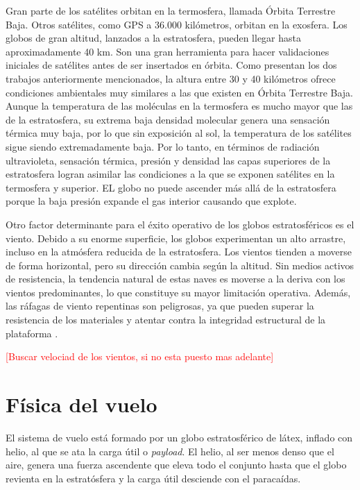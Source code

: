 \documentclass[12pt,a4paper]{article}
\newcommand{\pendiente}[1]{\textcolor{red}{[#1]}}
\begin{document}
Gran parte de los satélites orbitan en la termosfera, llamada Órbita Terrestre Baja. Otros satélites, como GPS a 36.000 kilómetros, orbitan en la exosfera. Los globos de gran altitud, lanzados a la estratosfera, pueden llegar hasta aproximadamente 40 km. Son una gran herramienta para hacer validaciones iniciales de satélites antes de ser insertados en órbita. Como presentan los dos trabajos anteriormente mencionados, la altura entre 30 y 40 kilómetros ofrece condiciones ambientales muy similares a las que existen en Órbita Terrestre Baja. Aunque la temperatura de las moléculas en la termosfera es mucho mayor que las de la estratosfera, su extrema baja densidad molecular genera una sensación térmica muy baja, por lo que sin exposición al sol, la temperatura de los satélites sigue siendo extremadamente baja. Por lo tanto, en términos de radiación ultravioleta, sensación térmica, presión y densidad las capas superiores de la estratosfera logran asimilar las condiciones a la que se exponen satélites en la termosfera y superior. EL globo no puede ascender más allá de la estratosfera porque la baja presión expande el gas interior causando que explote.

Otro factor determinante para el éxito operativo de los globos estratosféricos es el viento. Debido a su enorme superficie, los globos experimentan un alto arrastre, incluso en la atmósfera reducida de la estratosfera. Los vientos tienden a moverse de forma horizontal, pero su dirección cambia según la altitud. Sin medios activos de resistencia, la tendencia natural de estas naves es moverse a la deriva con los vientos predominantes, lo que constituye su mayor limitación operativa. Además, las ráfagas de viento repentinas son peligrosas, ya que pueden superar la resistencia de los materiales y atentar contra la integridad estructural de la plataforma \cite{ref4}.

\pendiente{Buscar velociad de los vientos, si no esta puesto mas adelante}

\newpage

\section{Física del vuelo}\label{fisica-del-vuelo}

El sistema de vuelo está formado por un globo estratosférico de látex, inflado con helio, al que se ata la carga útil o \textit{payload}. El helio, al ser menos denso que el aire, genera una fuerza ascendente que eleva todo el conjunto hasta que el globo revienta en la estratósfera y la carga útil desciende con el paracaídas.
\end{document}
